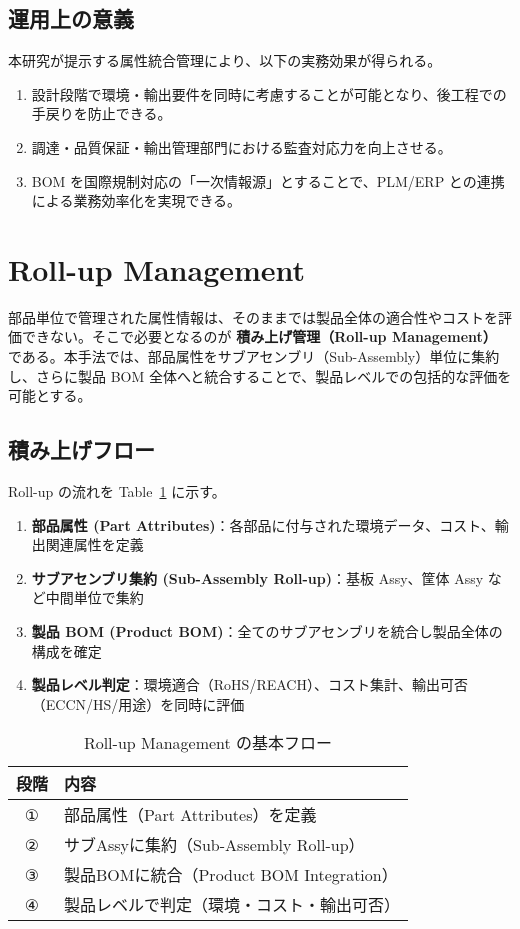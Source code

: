 \documentclass[10pt,conference]{IEEEtran}
\begin{document}
\subsection{運用上の意義}
本研究が提示する属性統合管理により、以下の実務効果が得られる。
\begin{enumerate}
  \item 設計段階で環境・輸出要件を同時に考慮することが可能となり、後工程での手戻りを防止できる。
  \item 調達・品質保証・輸出管理部門における監査対応力を向上させる。
  \item BOM を国際規制対応の「一次情報源」とすることで、PLM/ERP との連携による業務効率化を実現できる。
\end{enumerate}

\section{Roll-up Management}
部品単位で管理された属性情報は、そのままでは製品全体の適合性やコストを評価できない。そこで必要となるのが \textbf{積み上げ管理（Roll-up Management）} である。本手法では、部品属性をサブアセンブリ（Sub-Assembly）単位に集約し、さらに製品 BOM 全体へと統合することで、製品レベルでの包括的な評価を可能とする。

\subsection{積み上げフロー}
Roll-up の流れを Table~\ref{tab:rollup} に示す。
\begin{enumerate}
  \item \textbf{部品属性 (Part Attributes)}：各部品に付与された環境データ、コスト、輸出関連属性を定義
  \item \textbf{サブアセンブリ集約 (Sub-Assembly Roll-up)}：基板 Assy、筐体 Assy など中間単位で集約
  \item \textbf{製品 BOM (Product BOM)}：全てのサブアセンブリを統合し製品全体の構成を確定
  \item \textbf{製品レベル判定}：環境適合（RoHS/REACH）、コスト集計、輸出可否（ECCN/HS/用途）を同時に評価
\end{enumerate}

\begin{table}[t]
\centering
\caption{Roll-up Management の基本フロー}
\label{tab:rollup}
\renewcommand{\arraystretch}{1.2}
\footnotesize
\begin{tabular}{@{}cl@{}}
\toprule
\textbf{段階} & \textbf{内容} \\
\midrule
① & 部品属性（Part Attributes）を定義 \\
② & サブAssyに集約（Sub-Assembly Roll-up） \\
③ & 製品BOMに統合（Product BOM Integration） \\
④ & 製品レベルで判定（環境・コスト・輸出可否） \\
\bottomrule
\end{tabular}
\end{table}
\end{document}
